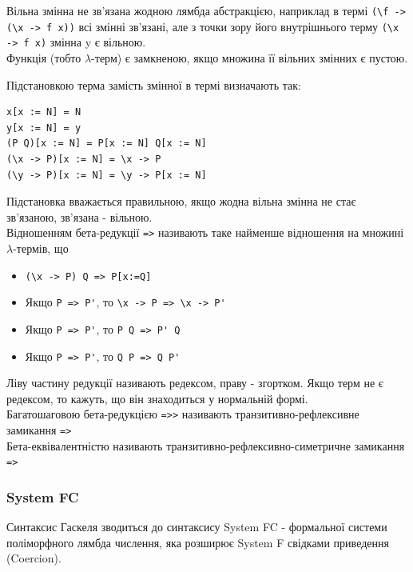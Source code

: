 \documentclass[12pt]{article}
\begin{document}
Вільна змінна не зв'язана жодною лямбда абстракцією, наприклад в термі \lstinline{(\f -> (\x -> f x))} 
всі змінні зв'язані, але з точки зору його внутрішнього терму \lstinline{(\x -> f x)} змінна y є вільною.\\

Функція (тобто $\lambda$-терм) є замкненою, якщо множина її вільних змінних є пустою.

Підстановкою терма замість змінної в термі визначають так:
\begin{lstlisting}[caption={Вільні змінні}]
x[x := N] = N
y[x := N] = y
(P Q)[x := N] = P[x := N] Q[x := N]
(\x -> P)[x := N] = \x -> P
(\y -> P)[x := N] = \y -> P[x := N]
\end{lstlisting}

Підстановка вважається правильною, якщо жодна вільна змінна не стає зв'язаною, зв'язана - вільною.\\

Відношенням бета-редукції \lstinline{=>} називають таке найменше відношення на множині $\lambda$-термів, що \\
\begin{itemize}
    \item \lstinline{(\x -> P) Q => P[x:=Q]}
    \item Якщо \lstinline{P => P'}, то \lstinline{\x -> P => \x -> P'}
    \item Якщо \lstinline{P => P'}, то \lstinline{P Q => P' Q}
    \item Якщо \lstinline{P => P'}, то \lstinline{Q P => Q P'}
\end{itemize}

Ліву частину редукції називають редексом, праву - згортком. Якщо терм не є редексом, 
то кажуть, що він знаходиться у нормальній формі.\\

Багатошаговою бета-редукцією \lstinline{=>>} називають транзитивно-рефлексивне замикання \lstinline{=>}\\

Бета-еквівалентністю називають транзитивно-рефлексивно-симетричне замикання \lstinline{=>}\\

\label{systemFC}
\subsubsection*{System FC}

Синтаксис Гаскеля зводиться до синтаксису System FC\cite{systemFC} - формальної системи поліморфного лямбда числення, 
яка розширює System F свідками приведення (Coercion).\\
\end{document}

